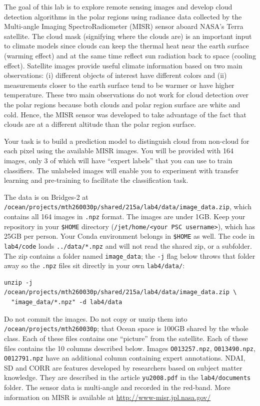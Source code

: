 \documentclass[letterpaper,12pt]{article}
\begin{document}
The goal of this lab is to explore remote sensing images and develop cloud detection algorithms in the polar regions using radiance data collected by the Multi-angle Imaging SpectroRadiometer (MISR) sensor aboard NASA’s Terra satellite. 
The cloud mask (signifying where the clouds are) is an important input to climate models since clouds can keep the thermal heat near the earth surface (warming effect) and at the same time reflect sun radiation back to space (cooling effect). 
Satellite images provide useful climate information based on two main observations: (i) different objects of interest have different colors and (ii) measurements closer to the earth surface tend to be warmer or have higher temperature. 
These two main observations do not work for cloud detection over the polar regions because both clouds and polar region surface are white and cold. 
Hence, the MISR sensor was developed to take advantage of the fact that clouds are at a different altitude than the polar region surface.

Your task is to build a prediction model to distinguish cloud from non-cloud for each pixel using the available MISR images. 
You will be provided with 164 images, only 3 of which will have ``expert labels'' that you can use to train classifiers. 
The unlabeled images will enable you to experiment with transfer learning and pre-training to facilitate the classification task.

The data is on Bridges-2 at \texttt{/ocean/projects/mth260030p/shared/215a/lab4/data/image\_data.zip}, which contains all 164 images in \texttt{.npz} format. The images are under 1GB.
Keep your repository in your \texttt{\$HOME} directory (\texttt{/jet/home/<your PSC username>}), which has 25GB per person. Your Conda environment belongs in \texttt{\$HOME} as well. The code in \texttt{lab4/code} loads \texttt{../data/*.npz} and will not read the shared zip, or a subfolder. The zip contains a folder named \texttt{image\_data}; the \texttt{-j} flag below throws that folder away so the \texttt{.npz} files sit directly in your own \texttt{lab4/data/}:

\begin{verbatim}
unzip -j /ocean/projects/mth260030p/shared/215a/lab4/data/image_data.zip \
  "image_data/*.npz" -d lab4/data
\end{verbatim}

Do not commit the images. Do not copy or unzip them into \texttt{/ocean/projects/mth260030p}; that Ocean space is 100GB shared by the whole class.
Each of these files contains one ``picture'' from the satellite. Each of these files contains the 10 columns described below. Images \texttt{O013257.npz}, \texttt{O013490.npz}, \texttt{O012791.npz} have an additional column containing expert annotations. NDAI, SD and CORR are features developed by researchers based on subject matter knowledge. They are described in the article \texttt{yu2008.pdf} in the \texttt{lab4/documents} folder. The sensor data is multi-angle and recorded in the red-band. More information on MISR is available at \url{http://www-misr.jpl.nasa.gov/}
\end{document}

